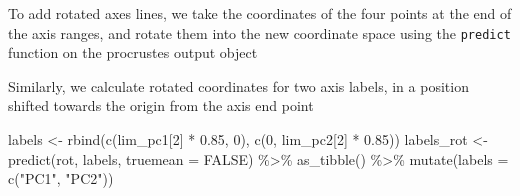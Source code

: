 \documentclass[
]{article}
\newenvironment{Shaded}{\begin{snugshade}}{\end{snugshade}}
\newcommand{\AttributeTok}[1]{\textcolor[rgb]{0.77,0.63,0.00}{#1}}
\newcommand{\ConstantTok}[1]{\textcolor[rgb]{0.00,0.00,0.00}{#1}}
\newcommand{\DecValTok}[1]{\textcolor[rgb]{0.00,0.00,0.81}{#1}}
\newcommand{\FloatTok}[1]{\textcolor[rgb]{0.00,0.00,0.81}{#1}}
\newcommand{\FunctionTok}[1]{\textcolor[rgb]{0.00,0.00,0.00}{#1}}
\newcommand{\NormalTok}[1]{#1}
\newcommand{\OtherTok}[1]{\textcolor[rgb]{0.56,0.35,0.01}{#1}}
\newcommand{\SpecialCharTok}[1]{\textcolor[rgb]{0.00,0.00,0.00}{#1}}
\newcommand{\StringTok}[1]{\textcolor[rgb]{0.31,0.60,0.02}{#1}}
\begin{document}
To add rotated axes lines, we take the coordinates of the four points at
the end of the axis ranges, and rotate them into the new coordinate
space using the \texttt{predict} function on the procrustes output
object

\begin{Shaded}
\end{Shaded}

Similarly, we calculate rotated coordinates for two axis labels, in a
position shifted towards the origin from the axis end point

\begin{Shaded}
\begin{Highlighting}[]
\NormalTok{labels }\OtherTok{\textless{}{-}} \FunctionTok{rbind}\NormalTok{(}\FunctionTok{c}\NormalTok{(lim\_pc1[}\DecValTok{2}\NormalTok{] }\SpecialCharTok{*} \FloatTok{0.85}\NormalTok{, }\DecValTok{0}\NormalTok{), }\FunctionTok{c}\NormalTok{(}\DecValTok{0}\NormalTok{, lim\_pc2[}\DecValTok{2}\NormalTok{] }\SpecialCharTok{*} \FloatTok{0.85}\NormalTok{))}
\NormalTok{labels\_rot }\OtherTok{\textless{}{-}} \FunctionTok{predict}\NormalTok{(rot, labels, }\AttributeTok{truemean =} \ConstantTok{FALSE}\NormalTok{) }\SpecialCharTok{\%\textgreater{}\%}
    \FunctionTok{as\_tibble}\NormalTok{() }\SpecialCharTok{\%\textgreater{}\%}
    \FunctionTok{mutate}\NormalTok{(}\AttributeTok{labels =} \FunctionTok{c}\NormalTok{(}\StringTok{"PC1"}\NormalTok{, }\StringTok{"PC2"}\NormalTok{))}
\end{Highlighting}
\end{Shaded}
\end{document}
